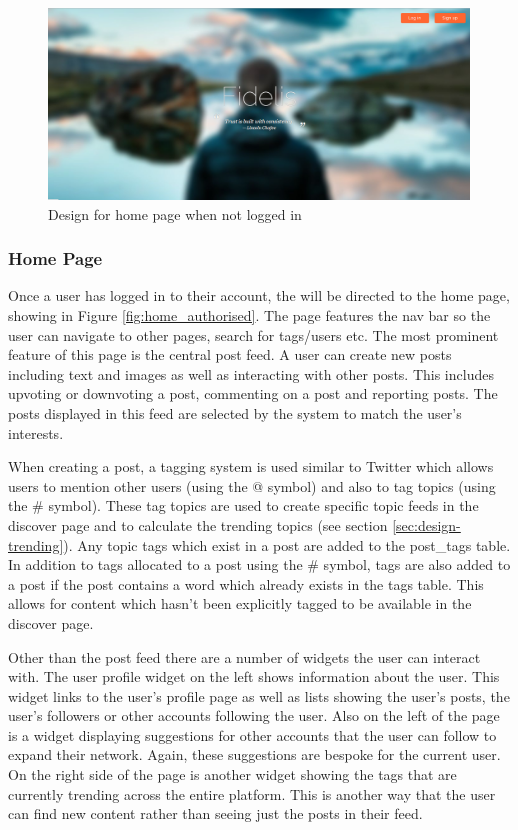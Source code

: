 \begin{figure}[H]
\centering
\includegraphics[height=2in]{Images/Design/home_unauthorised}
\caption{Design for home page when not logged in}
\label{fig:home_unauthorised}
\end{figure}

\subsubsection{Home Page}
Once a user has logged in to their account, the will be directed to the home page, showing in Figure \ref{fig:home_authorised}. The page features the nav bar so the user can navigate to other pages, search for tags/users etc. The most prominent feature of this page is the central post feed. A user can create new posts including text and images as well as interacting with other posts. This includes upvoting or downvoting a post, commenting on a post and reporting posts. The posts displayed in this feed are selected by the system to match the user's interests.

When creating a post, a tagging system is used similar to Twitter which allows users to mention other users (using the @ symbol) and also to tag topics (using the \# symbol). These tag topics are used to create specific topic feeds in the discover page and to calculate the trending topics (see section \ref{sec:design-trending}). Any topic tags which exist in a post are added to the post\_tags table. In addition to tags allocated to a post using the \# symbol, tags are also added to a post if the post contains a word which already exists in the tags table. This allows for content which hasn't been explicitly tagged to be available in the discover page.

Other than the post feed there are a number of widgets the user can interact with. The user profile widget on the left shows information about the user. This widget links to the user's profile page as well as lists showing the user's posts, the user's followers or other accounts following the user. Also on the left of the page is a widget displaying suggestions for other accounts that the user can follow to expand their network. Again, these suggestions are bespoke for the current user. On the right side of the page is another widget showing the tags that are currently trending across the entire platform. This is another way that the user can find new content rather than seeing just the posts in their feed.

